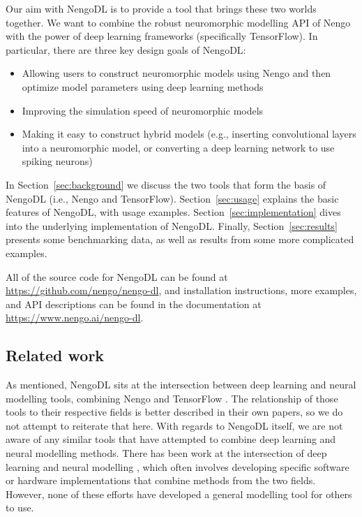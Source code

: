 \documentclass{article}
\begin{document}
Our aim with NengoDL is to provide a tool that brings these two worlds together.  We want to combine the robust neuromorphic modelling API of Nengo with the power of deep learning frameworks (specifically TensorFlow).  In particular, there are three key design goals of NengoDL:

\begin{itemize}
\item Allowing users to construct neuromorphic models using Nengo and then optimize model parameters using deep learning methods
\item Improving the simulation speed of neuromorphic models
\item Making it easy to construct hybrid models (e.g., inserting convolutional layers into a neuromorphic model, or converting a deep learning network to use spiking neurons)
\end{itemize}

In Section~\ref{sec:background} we discuss the two tools that form the basis of NengoDL (i.e., Nengo and TensorFlow).  Section~\ref{sec:usage} explains the basic features of NengoDL, with usage examples.  Section~\ref{sec:implementation} dives into the underlying implementation of NengoDL.  Finally, Section~\ref{sec:results} presents some benchmarking data, as well as results from some more complicated examples.

All of the source code for NengoDL can be found at \url{https://github.com/nengo/nengo-dl}, and installation instructions, more examples, and API descriptions can be found in the documentation at \url{https://www.nengo.ai/nengo-dl}.

\subsection{Related work}

As mentioned, NengoDL sits at the intersection between deep learning and neural modelling tools, combining Nengo \citep{Bekolay2014} and TensorFlow \citep{Abadi2016}.  The relationship of those tools to their respective fields is better described in their own papers, so we do not attempt to reiterate that here.  With regards to NengoDL itself, we are not aware of any similar tools that have attempted to combine deep learning and neural modelling methods.  There has been work at the intersection of deep learning and neural modelling \citep[e.g.,][]{Esser2015,Hunsberger2015,Kriegeskorte2015,Yamins2016,Lee2016}, which often involves developing specific software or hardware implementations that combine methods from the two fields. However, none of these efforts have developed a general modelling tool for others to use.
\end{document}
